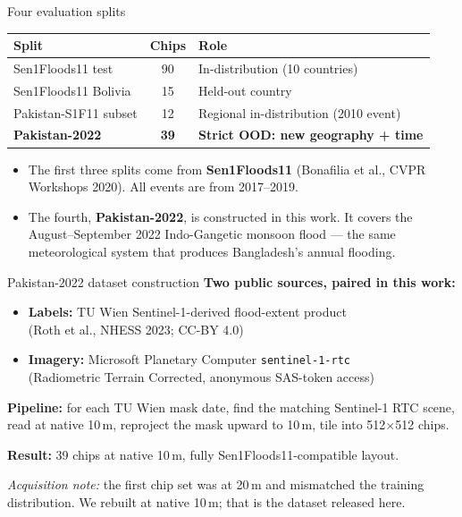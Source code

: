 \documentclass[aspectratio=169,11pt]{beamer}
\begin{document}
\begin{frame}{Four evaluation splits}
\begin{center}
\small
\begin{tabular}{lcl}
\toprule
\textbf{Split} & \textbf{Chips} & \textbf{Role} \\
\midrule
Sen1Floods11 test       & 90  & In-distribution (10 countries) \\
Sen1Floods11 Bolivia    & 15  & Held-out country \\
Pakistan-S1F11 subset   & 12  & Regional in-distribution (2010 event) \\
\textcolor{accent}{\textbf{Pakistan-2022}} & \textcolor{accent}{\textbf{39}} & \textcolor{accent}{\textbf{Strict OOD: new geography + time}} \\
\bottomrule
\end{tabular}
\end{center}
\vspace{0.6em}
\begin{itemize}
    \item The first three splits come from \textbf{Sen1Floods11} (Bonafilia et al., CVPR Workshops 2020). All events are from 2017--2019.
    \item The fourth, \textbf{Pakistan-2022}, is constructed in this work. It covers the August--September 2022 Indo-Gangetic monsoon flood --- the same meteorological system that produces Bangladesh's annual flooding.
\end{itemize}
\end{frame}

\begin{frame}{Pakistan-2022 dataset construction}
\textbf{Two public sources, paired in this work:}
\begin{itemize}
    \item \textbf{Labels:} TU Wien Sentinel-1-derived flood-extent product\\ (Roth et al., NHESS 2023; CC-BY 4.0)
    \item \textbf{Imagery:} Microsoft Planetary Computer \texttt{sentinel-1-rtc}\\ (Radiometric Terrain Corrected, anonymous SAS-token access)
\end{itemize}
\vspace{0.6em}

\textbf{Pipeline:} for each TU Wien mask date, find the matching Sentinel-1 RTC scene, read at native 10\,m, reproject the mask upward to 10\,m, tile into 512$\times$512 chips.

\vspace{0.6em}
\textbf{Result:} 39 chips at native 10\,m, fully Sen1Floods11-compatible layout.

\vspace{0.4em}
\textcolor{warn}{\emph{Acquisition note:}} the first chip set was at 20\,m and mismatched the training distribution. We rebuilt at native 10\,m; that is the dataset released here.
\end{frame}
\end{document}
